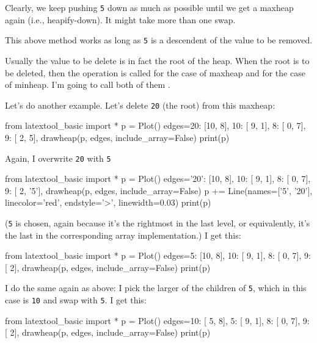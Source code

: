 Clearly, we keep pushing \texttt{5} down as much as possible until
we get a maxheap again (i.e., heapify-down).
It might take more than one swap.

This above method works as long as \texttt{5} is a descendent of the
value to be removed.

Usually the value to be delete is in fact the root of the heap.
When the root is to be deleted, then the operation is called
 for the case of maxheap
and  for the case of
minheap.
I'm going to call both of them .

Let's do another example.
Let's delete \texttt{20} (the root) from this maxheap:

\begin{python}
from latextool_basic import *
p = Plot()
edges={20: [10, 8],
       10: [ 9, 1],
        8: [ 0, 7],
        9: [ 2, 5],
      }
drawheap(p, edges, include_array=False)
print(p)
\end{python}


Again, I overwrite \texttt{20} with \texttt{5}

\begin{python}
from latextool_basic import *
p = Plot()
edges={'20': [10, 8],
       10: [ 9, 1],
        8: [ 0, 7],
        9: [ 2, '5'],
      }
drawheap(p, edges, include_array=False)
p += Line(names=['5', '20'], linecolor='red', endstyle='>', linewidth=0.03)      
print(p)
\end{python}

(\texttt{5} is chosen, again because it's the rightmost
in the last level, or equivalently, it's the last in the
corresponding array implementation.)
I get this:

\begin{python}
from latextool_basic import *
p = Plot()
edges={5: [10, 8],
       10: [ 9, 1],
        8: [ 0, 7],
        9: [ 2],
      }
drawheap(p, edges, include_array=False)
print(p)
\end{python}

I do the same again as above: I pick the larger of the children
of \texttt{5}, which in this case is \texttt{10} and swap with \texttt{5}.
I get this:

\begin{python}
from latextool_basic import *
p = Plot()
edges={10: [ 5, 8],
        5: [ 9, 1],
        8: [ 0, 7],
        9: [ 2],
      }
drawheap(p, edges, include_array=False)
print(p)
\end{python}

